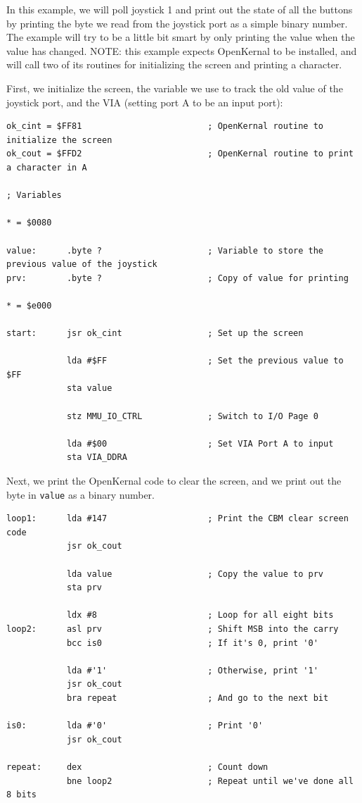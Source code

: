 In this example, we will poll joystick 1 and print out the state of all the buttons by printing the byte we read from the joystick port as a simple binary number. The example will try to be a little bit smart by only printing the value when the value has changed. NOTE: this example expects OpenKernal to be installed, and will call two of its routines for initializing the screen and printing a character.

First, we initialize the screen, the variable we use to track the old value of the joystick port, and the VIA (setting port A to be an input port):
\begin{verbatim}
ok_cint = $FF81                         ; OpenKernal routine to initialize the screen
ok_cout = $FFD2                         ; OpenKernal routine to print a character in A

; Variables

* = $0080

value:      .byte ?                     ; Variable to store the previous value of the joystick
prv:        .byte ?                     ; Copy of value for printing

* = $e000

start:      jsr ok_cint                 ; Set up the screen

            lda #$FF                    ; Set the previous value to $FF
            sta value

            stz MMU_IO_CTRL             ; Switch to I/O Page 0

            lda #$00                    ; Set VIA Port A to input
            sta VIA_DDRA
\end{verbatim}

Next, we print the OpenKernal code to clear the screen, and we print out the byte in \verb+value+ as a binary number.

\begin{verbatim}
loop1:      lda #147                    ; Print the CBM clear screen code
            jsr ok_cout

            lda value                   ; Copy the value to prv
            sta prv

            ldx #8                      ; Loop for all eight bits
loop2:      asl prv                     ; Shift MSB into the carry
            bcc is0                     ; If it's 0, print '0'

            lda #'1'                    ; Otherwise, print '1'
            jsr ok_cout
            bra repeat                  ; And go to the next bit

is0:        lda #'0'                    ; Print '0'
            jsr ok_cout

repeat:     dex                         ; Count down
            bne loop2                   ; Repeat until we've done all 8 bits
\end{verbatim}

